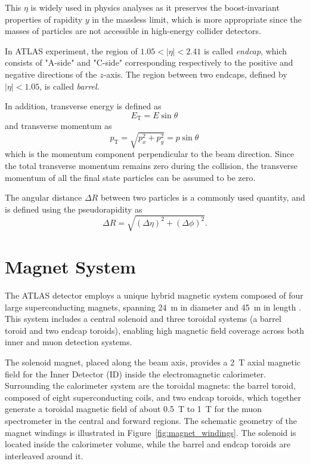 This \(\eta\) is widely used in physics analyses as it preserves the boost-invariant properties of rapidity \(y\) in the massless limit, which is more appropriate since the masses of particles are not accessible in high-energy collider detectors.

In ATLAS experiment, the region of $1.05 < |\eta| < 2.41$ is called \textit{endcap}, which consists of "A-side" and "C-side" corresponding respectively to the positive and negative directions of the \(z\)-axis. The region between two endcaps, defined by $|\eta| < 1.05$, is called \textit{barrel}.

In addition, transverse energy is defined as 
\[
  E_{\mathrm{T}} = E \sin \theta\,
\]
and transverse momentum as
\[
  p_{\mathrm{T}} = \sqrt{p_x^2 + p_y^2} = p \sin \theta\,
\]
which is the momentum component perpendicular to the beam direction. Since the total transverse momentum remains zero during the collision, the transverse momentum of all the final state particles can be assumed to be zero.

The angular distance \(\Delta R\) between two particles is a commonly used quantity, and is defined using the pseudorapidity as
\begin{equation}
  \Delta R = \sqrt{(\Delta \eta)^2 + (\Delta \phi)^2}.
  \label{eq:deltaR}
\end{equation}
\section{Magnet System} \label{sec:MagnetSystem}
The ATLAS detector employs a unique hybrid magnetic system composed of four large superconducting magnets, spanning 24~m in diameter and 45~m in length \cite{ATLASDetector2008}. This system includes a central solenoid and three toroidal systems (a barrel toroid and two endcap toroids), enabling high magnetic field coverage across both inner and muon detection systems.

The solenoid magnet, placed along the beam axis, provides a 2~T axial magnetic field for the Inner Detector (ID) inside the electromagnetic calorimeter. Surrounding the calorimeter system are the toroidal magnets: the barrel toroid, composed of eight superconducting coils, and two endcap toroids, which together generate a toroidal magnetic field of about 0.5~T to 1~T for the muon spectrometer in the central and forward regions. The schematic geometry of the magnet windings is illustrated in Figure~\ref{fig:magnet_windings}. The solenoid is located inside the calorimeter volume, while the barrel and endcap toroids are interleaved around it. 

